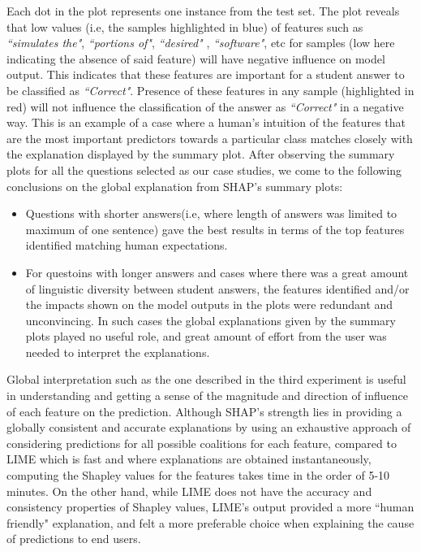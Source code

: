 \documentclass[letterpaper, 10 pt, conference]{ieeeconf}  %
\begin{document}
Each dot in the plot represents one instance from the test set. The plot reveals that low values (i.e, the samples highlighted in blue) of features such as \textit{``simulates the"}, \textit{``portions of"}, \textit{``desired"} , \textit{``software"}, etc for samples (low here indicating the absence of said feature) will have negative influence on model output. This indicates that these features are important for a student answer to be classified as \textit{``Correct"}. Presence of these features in any sample (highlighted in red) will not influence the classification of the answer as \textit{``Correct"} in a negative way. This is an example of a case where a human's intuition of the features that are the most important predictors towards a particular class matches closely with the explanation displayed by the summary plot. After observing the summary plots for all the questions selected as our case studies, we come to the following conclusions on the global explanation from SHAP's summary plots:
\begin{itemize}
\item Questions with shorter answers(i.e, where length of answers was limited to maximum of one sentence) gave the best results in terms of the top features identified matching human expectations.
\item For questoins with longer answers and cases where there was a great amount of linguistic diversity between student answers, the features identified and/or the impacts shown on the model outputs in the plots were redundant and unconvincing. In such cases the global explanations given by the summary plots played no useful role, and great amount of effort from the user was needed to interpret the explanations.
\end{itemize}
Global interpretation such as the one described in the third experiment is useful in understanding and getting a sense of the magnitude and direction of influence of each feature on the prediction. Although SHAP’s strength lies in providing a globally consistent and accurate explanations by using an exhaustive approach of considering predictions for all possible coalitions for each feature, compared to LIME which is fast and where explanations are obtained instantaneously, computing the Shapley values for the features takes time in the order of 5-10 minutes. On the other hand, while LIME does not have the accuracy and consistency properties of Shapley values, LIME's output provided a more ``human friendly" explanation, and felt a more preferable choice when explaining the cause of predictions to end users.
\end{document}
